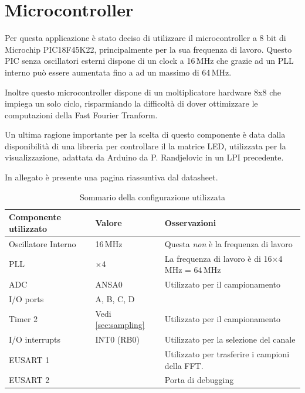 \section{Microcontroller}
Per questa applicazione \`e stato deciso di utilizzare il microcontroller a 8
bit di Microchip PIC18F45K22, principalmente per la sua frequenza di lavoro.
Questo PIC senza oscillatori esterni dispone di un clock a 16\,MHz che grazie
ad un PLL interno pu\`o essere aumentata fino a ad un massimo di 64\,MHz.

Inoltre questo microcontroller dispone di un moltiplicatore hardware 8x8 che
impiega un solo ciclo, risparmiando la difficolt\`a di dover ottimizzare le
computazioni della Fast Fourier Tranform.

Un ultima ragione importante per la scelta di questo componente \`e data dalla
disponibilit\`a di una libreria per controllare il la matrice LED, utilizzata
per la visualizzazione, adattata da Arduino da P. Randjelovic in un LPI
precedente.

In allegato \`e presente una pagina riassuntiva dal datasheet.

\begin{table}[H] \centering
    \caption{Sommario della configurazione utilizzata}
    \begin{tabularx}{\textwidth}{l l X}
        \toprule
        \bfseries Componente utilizzato & \bfseries Valore & \bfseries Osservazioni \\
        \midrule
        Oscillatore Interno & 16\,MHz & 
            Questa \emph{non} \`e la frequenza di lavoro \\
        PLL & \(\times\)4 & 
            La frequenza di lavoro \`e di 16\(\times\)4\,MHz = 64\,MHz \\
        ADC & \ttfamily ANSA0 &
            Utilizzato per il campionamento \\
        I/O ports & \ttfamily A, B, C, D & \\
        Timer 2 & Vedi \ref{sec:sampling} & Utilizzato per il campionamento \\
        I/O interrupts & \ttfamily INT0 (RB0) &
            Utilizzato per la selezione del canale \\
        EUSART 1 & & 
            Utilizzato per trasferire i campioni della FFT. \\
        EUSART 2 & &
            Porta di debugging \\
        \bottomrule
    \end{tabularx}
\end{table}


